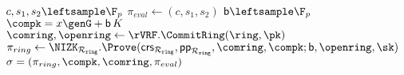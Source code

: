 \begin{algorithm}
	\eprint{}{\small}
	\caption{$\Gen_{sign}(\ring,\sk=(x,r),\pk,\aux,\msg)$}
	\label{alg:gensign}	 	
	\begin{algorithmic}[1]
			\State $ c,s_1, s_2 \leftsample \F_p $
			\State $ \pi_{eval}  \leftarrow (c,s_1, s_2)$
			\State $ \openpk \leftsample \F_p $
			\State $ \compk =  x \genG + \openpk \, K$
			\State $ \comring, \openring \leftarrow \rVRF.\CommitRing(\ring, \pk) $ \label{line:comring}
			\State $ \pi_{ring} \leftarrow \NIZK_{\Rring}.\Prove(\crs_{\Rring}, \pp_{\Rring}, \comring, \compk; \openpk, \openring, \sk) $ \label{line:piring}
			\State\Return$ \sigma = (\pi_{ring},\compk,\comring,\pi_{eval}) $
		\end{algorithmic}
	
\end{algorithm}
%
%
